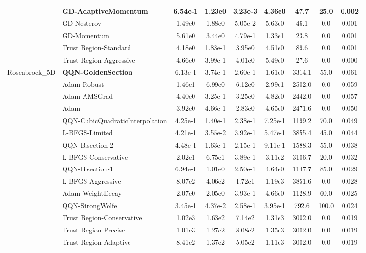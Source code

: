 \documentclass{article}
\begin{document}
\begin{longtable}{|l|l|c|c|c|c|c|c|c|}
\hline
 & GD-AdaptiveMomentum & 6.54e-1 & 1.23e0 & 3.23e-3 & 4.36e0 & 47.7 & 25.0 & 0.002 \\
\hline
 & GD-Nesterov & 1.49e0 & 1.88e0 & 5.05e-2 & 5.63e0 & 46.1 & 0.0 & 0.001 \\
\hline
 & GD-Momentum & 5.61e0 & 3.44e0 & 4.79e-1 & 1.33e1 & 23.8 & 0.0 & 0.001 \\
\hline
 & Trust Region-Standard & 4.18e0 & 1.83e-1 & 3.95e0 & 4.51e0 & 89.6 & 0.0 & 0.001 \\
\hline
 & Trust Region-Aggressive & 4.66e0 & 3.99e-1 & 4.01e0 & 5.49e0 & 27.6 & 0.0 & 0.000 \\
Rosenbrock\_5D & \textbf{QQN-GoldenSection} & 6.13e-1 & 3.74e-1 & 2.60e-1 & 1.61e0 & 3314.1 & 55.0 & 0.061 \\
\hline
 & Adam-Robust & 1.46e1 & 6.99e0 & 6.12e0 & 2.99e1 & 2502.0 & 0.0 & 0.059 \\
\hline
 & Adam-AMSGrad & 4.40e0 & 3.25e-1 & 3.25e0 & 4.82e0 & 2442.0 & 0.0 & 0.057 \\
\hline
 & Adam & 3.92e0 & 4.66e-1 & 2.83e0 & 4.65e0 & 2471.6 & 0.0 & 0.050 \\
\hline
 & QQN-CubicQuadraticInterpolation & 4.25e-1 & 1.40e-1 & 2.38e-1 & 7.25e-1 & 1199.2 & 70.0 & 0.049 \\
\hline
 & L-BFGS-Limited & 4.21e-1 & 3.55e-2 & 3.92e-1 & 5.47e-1 & 3855.4 & 45.0 & 0.044 \\
\hline
 & QQN-Bisection-2 & 4.48e-1 & 1.63e-1 & 2.15e-1 & 9.11e-1 & 1588.3 & 55.0 & 0.038 \\
\hline
 & L-BFGS-Conservative & 2.02e1 & 6.75e1 & 3.89e-1 & 3.11e2 & 3106.7 & 20.0 & 0.032 \\
\hline
 & QQN-Bisection-1 & 6.94e-1 & 1.01e0 & 2.50e-1 & 4.64e0 & 1147.7 & 85.0 & 0.029 \\
\hline
 & L-BFGS-Aggressive & 8.07e2 & 4.06e2 & 1.72e1 & 1.19e3 & 3851.6 & 0.0 & 0.028 \\
\hline
 & Adam-WeightDecay & 2.07e0 & 2.05e0 & 3.93e-1 & 4.66e0 & 1128.9 & 60.0 & 0.025 \\
\hline
 & QQN-StrongWolfe & 3.45e-1 & 4.37e-2 & 2.58e-1 & 3.95e-1 & 792.6 & 100.0 & 0.024 \\
\hline
 & Trust Region-Conservative & 1.02e3 & 1.63e2 & 7.14e2 & 1.31e3 & 3002.0 & 0.0 & 0.019 \\
\hline
 & Trust Region-Precise & 1.01e3 & 1.27e2 & 8.08e2 & 1.35e3 & 3002.0 & 0.0 & 0.019 \\
\hline
 & Trust Region-Adaptive & 8.41e2 & 1.37e2 & 5.05e2 & 1.11e3 & 3002.0 & 0.0 & 0.019 \\

\end{longtable}
\end{document}
